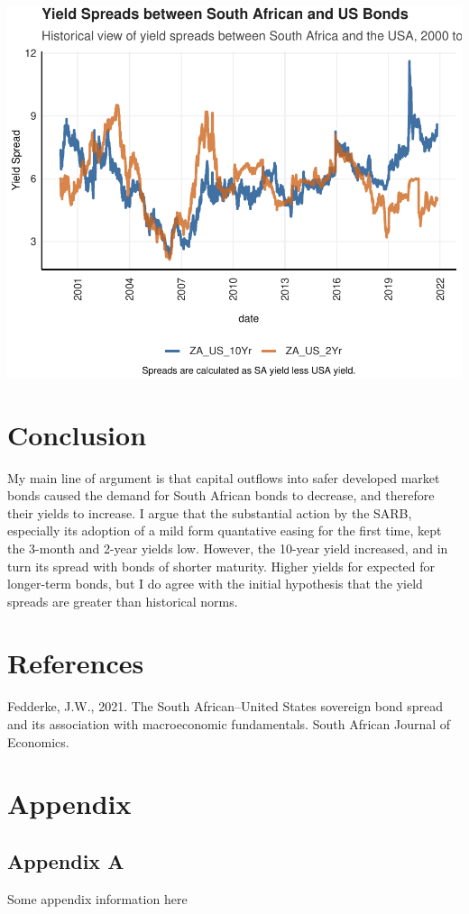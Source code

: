\documentclass[11pt,preprint, authoryear]{elsarticle}
\numberwithin{equation}{section}
\numberwithin{figure}{section}
\numberwithin{table}{section}
\begin{document}
\includegraphics{Question_1_files/figure-latex/unnamed-chunk-4-1.pdf}

\hypertarget{conclusion}{%
\section{Conclusion}\label{conclusion}}

My main line of argument is that capital outflows into safer developed
market bonds caused the demand for South African bonds to decrease, and
therefore their yields to increase. I argue that the substantial action
by the SARB, especially its adoption of a mild form quantative easing
for the first time, kept the 3-month and 2-year yields low. However, the
10-year yield increased, and in turn its spread with bonds of shorter
maturity. Higher yields for expected for longer-term bonds, but I do
agree with the initial hypothesis that the yield spreads are greater
than historical norms.

\newpage

\hypertarget{references}{%
\section*{References}\label{references}}

Fedderke, J.W., 2021. The South African--United States sovereign bond
spread and its association with macroeconomic fundamentals. South
African Journal of Economics.

\hypertarget{appendix}{%
\section*{Appendix}\label{appendix}}

\hypertarget{appendix-a}{%
\subsection*{Appendix A}\label{appendix-a}}

Some appendix information here


\end{document}

